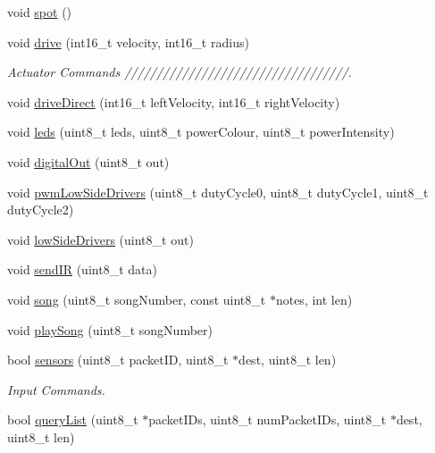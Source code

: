 \begin{DoxyCompactItemize}
\item 
void \hyperlink{class_arduino_roomba_ad4cee03aee250ec956a178e0ca95b297}{spot} ()
\item 
void \hyperlink{class_arduino_roomba_af1d4b64c2e66d1ef8b5583d1d9442856}{drive} (int16\_\-t velocity, int16\_\-t radius)
\begin{DoxyCompactList}\small\item\em Actuator Commands ///////////////////////////////////. \item\end{DoxyCompactList}\item 
void \hyperlink{class_arduino_roomba_a9af2b51a8f3a72a0a906d412c5863fb7}{driveDirect} (int16\_\-t leftVelocity, int16\_\-t rightVelocity)
\item 
void \hyperlink{class_arduino_roomba_a03c310c1247df2636d236bb633529fc3}{leds} (uint8\_\-t leds, uint8\_\-t powerColour, uint8\_\-t powerIntensity)
\item 
void \hyperlink{class_arduino_roomba_af9adb4ea958dc11adcdbb89c394f0ccc}{digitalOut} (uint8\_\-t out)
\item 
void \hyperlink{class_arduino_roomba_a5be9ba9927edecc77905c92771d7a483}{pwmLowSideDrivers} (uint8\_\-t dutyCycle0, uint8\_\-t dutyCycle1, uint8\_\-t dutyCycle2)
\item 
void \hyperlink{class_arduino_roomba_ae9f66b6d0eb850b4bcae3aeaa9b092e2}{lowSideDrivers} (uint8\_\-t out)
\item 
void \hyperlink{class_arduino_roomba_a268d068b9c0253f237165de1bbbc11df}{sendIR} (uint8\_\-t data)
\item 
void \hyperlink{class_arduino_roomba_aef389c1f20272d988463227a3014dd03}{song} (uint8\_\-t songNumber, const uint8\_\-t $\ast$notes, int len)
\item 
void \hyperlink{class_arduino_roomba_a8c89574185bae1b51e96aa79ce2790ed}{playSong} (uint8\_\-t songNumber)
\item 
bool \hyperlink{class_arduino_roomba_a4f4e7139b7cd0ec2ddbb09d18e8a8f08}{sensors} (uint8\_\-t packetID, uint8\_\-t $\ast$dest, uint8\_\-t len)
\begin{DoxyCompactList}\small\item\em Input Commands. \item\end{DoxyCompactList}\item 
bool \hyperlink{class_arduino_roomba_a44be486f377bec58f83bfebc4791f298}{queryList} (uint8\_\-t $\ast$packetIDs, uint8\_\-t numPacketIDs, uint8\_\-t $\ast$dest, uint8\_\-t len)
\item 

\end{DoxyCompactItemize}

